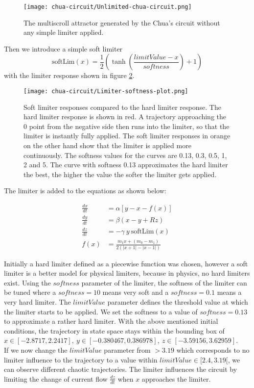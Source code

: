 \documentclass[main]{subfiles}
\begin{document}
\begin{figure}[H]
\centering
\texttt{[image: chua-circuit/Unlimited-chua-circuit.png]}
\caption[The multiscroll attractor]{The multiscroll attractor generated by the Chua's circuit without any simple limiter applied.}
\label{figure:chaoticchuacircuit}
\end{figure}

Then we introduce a simple soft limiter \[\text{softLim}(x) = \frac{1}{2} \left(\tanh\left(\frac{limitValue - x}{softness}\right) + 1\right)\] with the limiter response shown in figure \ref{figure:softlimiterresponse}.

\begin{figure}[H]
\centering
\texttt{[image: chua-circuit/Limiter-softness-plot.png]}
\caption[Soft limiter responses]{Soft limiter responses compared to the hard limiter response. The hard limiter response is shown in red. A trajectory approaching the 0 point from the negative side then runs into the limiter, so that the limiter is instantly fully applied. The soft limiter responses in orange on the other hand show that the limiter is applied more continuously. The softness values for the curves are 0.13, 0.3, 0.5, 1, 2 and 5. The curve with softness 0.13 approximates the hard limiter the best, the higher the value the softer the limiter gets applied. }
\label{figure:softlimiterresponse}
\end{figure}

The limiter is added to the equations as shown below:

\begin{align*}
\frac{dx}{dt}&=\alpha [y-x-f(x)] \\
\frac{dy}{dt}&=\beta (x-y+Rz)\\
\frac{dz}{dt}&=-\gamma ~ y ~ \text{softLim}(x)\\
f (x) &= \frac{m_1 x + (m_0 - m_1)}{2 (| x + 1 | -| x - 1 |)}
\end{align*}

Initially a hard limiter defined as a piecewise function was chosen, however a soft limiter is a better model for physical limiters, because in physics, no hard limiters exist. Using the $softness$ parameter of the limiter, the softness of the limiter can be tuned where a \(softness = 10\) means very soft and a \(softness = 0.1\) means a very hard limiter. The $limitValue$ parameter defines the threshold value at which the limiter starts to be applied. We set the softness to a value of \(softness=0.13\) to approximate a rather hard limiter. With the above mentioned initial conditions, the trajectory in state space stays within the bounding box of \(x \in [-2.8717,2.2417],~y \in [-0.380467,0.386978],~z \in [-3.59156,3.62959]\).\\
If we now change the $limitValue$ parameter from \(>3.19\) which corresponds to no limiter influence to the trajectory to a value within \(limitValue \in [2.4,3.19[\), we can observe different chaotic trajectories. The limiter influences the circuit by limiting the change of current flow \(\frac{dz}{dt}\) when \(x\) approaches the limiter.
\end{document}

